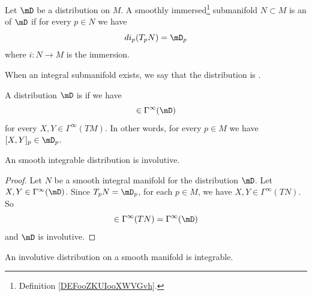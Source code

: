 \begin{definition}
	Let \( \mD\) be a distribution on \( M\). A smoothly immersed\footnote{Definition \ref{DEFooZKUIooXWVGvh}.} submanifold \( N\subset M\) is an  of \( \mD\) if for every \( p\in N\) we have
	\begin{equation}
		di_p(T_pN)=\mD_p
	\end{equation}
	where \( i\colon N\to M\) is the immersion.

	When an integral submanifold exists, we say that the distribution is .
\end{definition}

\begin{definition}
	A distribution \( \mD\) is  if we have
	\begin{equation}
		[X,Y]\in \Gamma^{\infty}(\mD)
	\end{equation}
	for every \( X,Y\in \Gamma^{\infty}(TM)\). In other words, for every \( p\in M\) we have \( [X,Y]_p\in \mD_p\).
\end{definition}

\begin{proposition}     \label{PROPooDYJNooAwnaFK}
	An smooth integrable distribution is involutive.
\end{proposition}

\begin{proof}
	Let \( N\) be a smooth integral manifold for the distribution \( \mD\).  Let \( X,Y\in\Gamma^{\infty}(\mD)\). Since \( T_pN=\mD_p\), for each \( p\in M\), we have \( X,Y\in\Gamma^{\infty}(TN)\). So
	\begin{equation}
		[X,Y]\in\Gamma^{\infty}(TN)=\Gamma^{\infty}(\mD)
	\end{equation}
	and \( \mD\) is involutive.
\end{proof}




\begin{theorem}        \label{THOooDVBHooGRhuGl}
	An involutive distribution on a smooth manifold is integrable.
\end{theorem}

